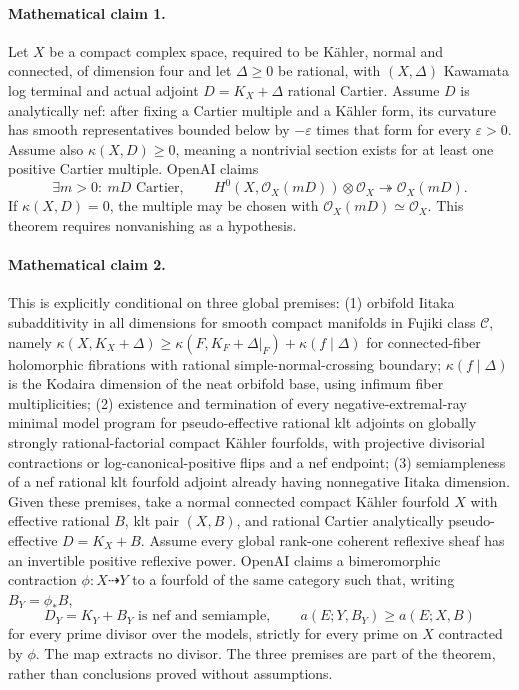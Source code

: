 \documentclass[11pt]{article}
\begin{document}
\paragraph{Mathematical claim 1.} Let $X$ be a compact complex space, required to be Kähler, normal and connected, of dimension four and let $\Delta\ge0$ be rational, with $(X,\Delta)$ Kawamata log terminal and actual adjoint $D=K_X+\Delta$ rational Cartier. Assume $D$ is analytically nef: after fixing a Cartier multiple and a Kähler form, its curvature has smooth representatives bounded below by $-\varepsilon$ times that form for every $\varepsilon>0$. Assume also $\kappa(X,D)\ge0$, meaning a nontrivial section exists for at least one positive Cartier multiple. OpenAI claims
\[
\exists m>0:\ mD\text{ Cartier},\qquad
H^0(X,\mathcal O_X(mD))\otimes\mathcal O_X\twoheadrightarrow\mathcal O_X(mD).
\]
If $\kappa(X,D)=0$, the multiple may be chosen with $\mathcal O_X(mD)\simeq\mathcal O_X$. This theorem requires nonvanishing as a hypothesis.

\paragraph{Mathematical claim 2.} This is explicitly conditional on three global premises: (1) orbifold Iitaka subadditivity in all dimensions for smooth compact manifolds in Fujiki class $\mathcal C$, namely $\kappa(X,K_X+\Delta)\ge\kappa(F,K_F+\Delta|_F)+\kappa(f\mid\Delta)$ for connected-fiber holomorphic fibrations with rational simple-normal-crossing boundary; $\kappa(f\mid\Delta)$ is the Kodaira dimension of the neat orbifold base, using infimum fiber multiplicities; (2) existence and termination of every negative-extremal-ray minimal model program for pseudo-effective rational klt adjoints on globally strongly rational-factorial compact Kähler fourfolds, with projective divisorial contractions or log-canonical-positive flips and a nef endpoint; (3) semiampleness of a nef rational klt fourfold adjoint already having nonnegative Iitaka dimension.
Given these premises, take a normal connected compact Kähler fourfold $X$ with effective rational $B$, klt pair $(X,B)$, and rational Cartier analytically pseudo-effective $D=K_X+B$. Assume every global rank-one coherent reflexive sheaf has an invertible positive reflexive power. OpenAI claims a bimeromorphic contraction $\phi:X\dashrightarrow Y$ to a fourfold of the same category such that, writing $B_Y=\phi_*B$,
\[
D_Y=K_Y+B_Y\text{ is nef and semiample},\qquad
 a(E;Y,B_Y)\ge a(E;X,B)
\]
for every prime divisor over the models, strictly for every prime on $X$ contracted by $\phi$. The map extracts no divisor. The three premises are part of the theorem, rather than conclusions proved without assumptions.
\end{document}
